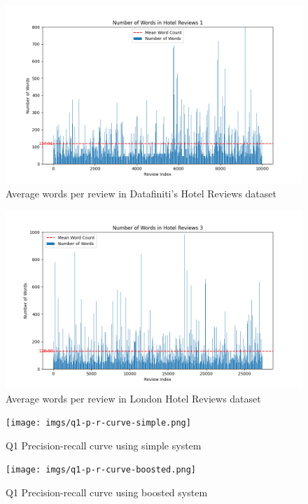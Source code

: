 \documentclass[sigconf]{acmart}
\begin{document}
\begin{figure}[h]
  \centering
  \includegraphics[width=\linewidth]{imgs/word_count_1.png}
  \caption{Average words per review in Datafiniti's Hotel Reviews dataset}
  \label{fig:reviewWords1}
\end{figure}

\begin{figure}[H]
  \centering
  \includegraphics[width=\linewidth]{imgs/word_count_3.png}
  \caption{Average words per review in London Hotel Reviews dataset}
  \label{fig:reviewWords3}
\end{figure}


\begin{figure}[H]
  \centering
  \texttt{[image: imgs/q1-p-r-curve-simple.png]}
  \caption{Q1 Precision-recall curve using simple system}
  \label{fig:q1_simple}
\end{figure}

\begin{figure}[H]
  \centering
  \texttt{[image: imgs/q1-p-r-curve-boosted.png]}
  \caption{Q1 Precision-recall curve using boosted system}
  \label{fig:q1_boosted}
\end{figure}
\end{document}
